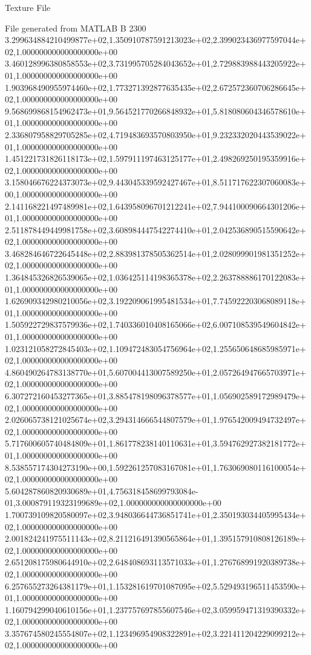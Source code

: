 Texture File 

File generated from MATLAB 
B 2300
3.299634884210499877e+02,1.350910787591213023e+02,2.399023436977597044e+02,1.000000000000000000e+00
3.460128996380858553e+02,3.731995705284043652e+01,2.729883988443205922e+01,1.000000000000000000e+00
1.903968490955974460e+02,1.773271392877635435e+02,2.672572360706286645e+02,1.000000000000000000e+00
9.568699868154962473e+01,9.564521770266848932e+01,5.818080604346578610e+01,1.000000000000000000e+00
2.336807958829705285e+02,4.719483693570803950e+01,9.232332020443539022e+01,1.000000000000000000e+00
1.451221731826118173e+02,1.597911197463125177e+01,2.498269250195359916e+02,1.000000000000000000e+00
3.158046676224373073e+02,9.443045339592427467e+01,8.511717622307060083e+00,1.000000000000000000e+00
2.141168221497489981e+02,1.643958096701212241e+02,7.944100090664301206e+01,1.000000000000000000e+00
2.511878449449981758e+02,3.608984447542274410e+01,2.042536890515590642e+02,1.000000000000000000e+00
3.468284646722645448e+02,2.883981378505362514e+01,2.028099901981351252e+02,1.000000000000000000e+00
1.364845326826539065e+02,1.036425114198365378e+02,2.263788886170122083e+01,1.000000000000000000e+00
1.626909342980210056e+02,3.192209061995481534e+01,7.745922203068089118e+01,1.000000000000000000e+00
1.505922729837579936e+02,1.740336010408165066e+02,6.007108539549604842e+01,1.000000000000000000e+00
1.023121058272845403e+02,1.109472483054756964e+02,1.255650648685985971e+02,1.000000000000000000e+00
4.860490264783138770e+01,5.607004413007589250e+01,2.057264947665703971e+02,1.000000000000000000e+00
6.307272160453277365e+01,3.885478198096378577e+01,1.056902589172989479e+02,1.000000000000000000e+00
2.026065738121025674e+02,3.294314666544807579e+01,1.976542009494732497e+02,1.000000000000000000e+00
5.717600605740484809e+01,1.861778238140110631e+01,3.594762927382181772e+01,1.000000000000000000e+00
8.538557174304273190e+00,1.592261257083167081e+01,1.763069080116100054e+02,1.000000000000000000e+00
5.604287860820930689e+01,4.756318458699793084e-01,3.000879119323199689e+02,1.000000000000000000e+00
1.700739109820580097e+02,3.948036644736851741e+01,2.350193034405995434e+02,1.000000000000000000e+00
2.001824241975511143e+02,8.211216491390565864e+01,1.395157910808126189e+02,1.000000000000000000e+00
2.651208175980644910e+02,2.648408693113571033e+01,1.276768991920389738e+02,1.000000000000000000e+00
6.257655273264381179e+01,1.153281619701087095e+02,5.529493196511453590e+01,1.000000000000000000e+00
1.160794299040610156e+01,1.237757697855607546e+02,3.059959471319390332e+02,1.000000000000000000e+00
3.357674580245554807e+02,1.123496954908322891e+02,3.221411204229099212e+02,1.000000000000000000e+00
